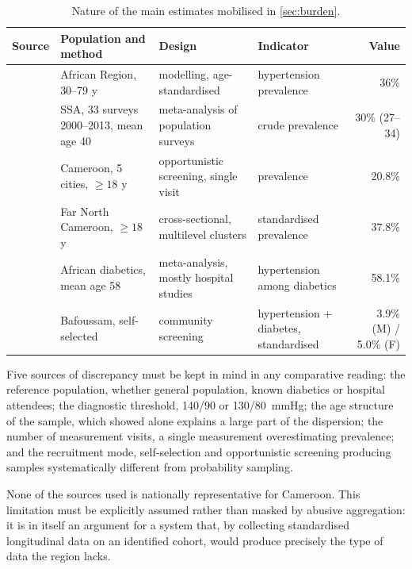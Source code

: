 \documentclass[12pt,a4paper,oneside]{report}
\begin{document}
\begin{table}[htbp]
\centering\footnotesize
\caption{Nature of the main estimates mobilised in \cref{sec:burden}.}\label{tab:comparability}
\begin{tabularx}{\textwidth}{@{}>{\raggedright\arraybackslash}p{2.6cm} >{\raggedright\arraybackslash}X >{\raggedright\arraybackslash}p{2.8cm} >{\raggedright\arraybackslash}p{2.4cm} r@{}}
\toprule
\textbf{Source} & \textbf{Population and method} & \textbf{Design} & \textbf{Indicator} & \textbf{Value} \\
\midrule
\textcite{who2023hypertension} & African Region, 30--79 y & modelling, age-standardised & hypertension prevalence & 36\% \\
\textcite{ataklte2015} & SSA, 33 surveys 2000--2013, mean age 40 & meta-analysis of population surveys & crude prevalence & 30\% (27--34) \\
\textcite{dzudie2021} & Cameroon, 5 cities, $\geq 18$ y & opportunistic screening, single visit & prevalence & 20.8\% \\
\textcite{lemogoum2018} & Far North Cameroon, $\geq 18$ y & cross-sectional, multilevel clusters & standardised prevalence & 37.8\% \\
\textcite{hinneh2023} & African diabetics, mean age 58 & meta-analysis, mostly hospital studies & hypertension among diabetics & 58.1\% \\
\textcite{katte2014} & Bafoussam, self-selected & community screening & hypertension + diabetes, standardised & 3.9\% (M) / 5.0\% (F) \\
\bottomrule
\end{tabularx}
\end{table}

Five sources of discrepancy must be kept in mind in any comparative reading: the reference population, whether general population, known diabetics or hospital attendees; the diagnostic threshold, 140/90 or 130/80~mmHg; the age structure of the sample, which \textcite{ataklte2015} showed alone explains a large part of the dispersion; the number of measurement visits, a single measurement overestimating prevalence; and the recruitment mode, self-selection and opportunistic screening producing samples systematically different from probability sampling.

None of the sources used is nationally representative for Cameroon. This limitation must be explicitly assumed rather than masked by abusive aggregation: it is in itself an argument for a system that, by collecting standardised longitudinal data on an identified cohort, would produce precisely the type of data the region lacks.
\end{document}
